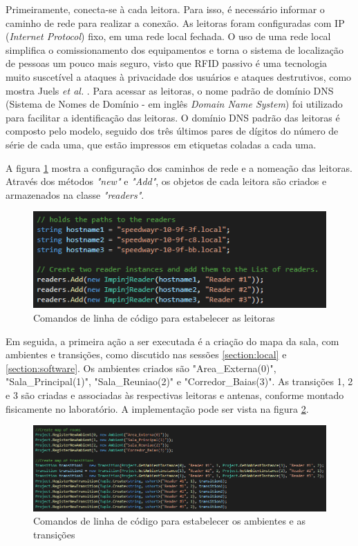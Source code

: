   Primeiramente, conecta-se à cada leitora. Para isso, é necessário informar o caminho de rede para realizar a conexão. As leitoras foram configuradas com IP (\textit{Internet Protocol}) fixo, em uma rede local fechada. O uso de uma rede local simplifica o comissionamento dos equipamentos e torna o sistema de localização de pessoas um pouco mais seguro, visto que RFID passivo é uma tecnologia muito suscetível a ataques à privacidade dos usuários e ataques destrutivos, como mostra Juels \textit{et al.} \cite{juels2006rfid}. Para acessar as leitoras, o nome padrão de domínio DNS (Sistema de Nomes de Domínio - em inglês \textit{Domain Name System}) foi utilizado para facilitar a identificação das leitoras. O domínio DNS padrão das leitoras é composto pelo modelo, seguido dos três últimos pares de dígitos do número de série de cada uma, que estão impressos em etiquetas coladas a cada uma.

  A figura \ref{fig:set_readers} mostra a configuração dos caminhos de rede e a nomeação das leitoras. Através dos métodos \textit{"new"} e \textit{"Add"}, os objetos de cada leitora são criados e armazenados na classe \textit{"readers"}.

 \begin{figure}[H]
    \centering
    \includegraphics[width=0.8\linewidth]{figs/Metodologia/set_readers.PNG}
    \caption{Comandos de linha de código para estabelecer as leitoras}
    \label{fig:set_readers}
\end{figure}

 Em seguida, a primeira ação a ser executada é a criação do mapa da sala, com ambientes e transições, como discutido nas sessões \ref{section:local} e \ref{section:software}. Os ambientes criados são "Area\_Externa(0)", "Sala\_Principal(1)", "Sala\_Reuniao(2)" e "Corredor\_Baias(3)". As transições 1, 2 e 3 são criadas e associadas às respectivas leitoras e antenas, conforme montado fisicamente no laboratório. A implementação pode ser vista na figura \ref{fig:set_AmbTran}.

 \begin{figure}[H]
    \centering
    \includegraphics[width=1\linewidth]{figs/Metodologia/set_rooms&transitions.PNG}
    \caption{Comandos de linha de código para estabelecer os ambientes e as transições}
    \label{fig:set_AmbTran}
\end{figure}

